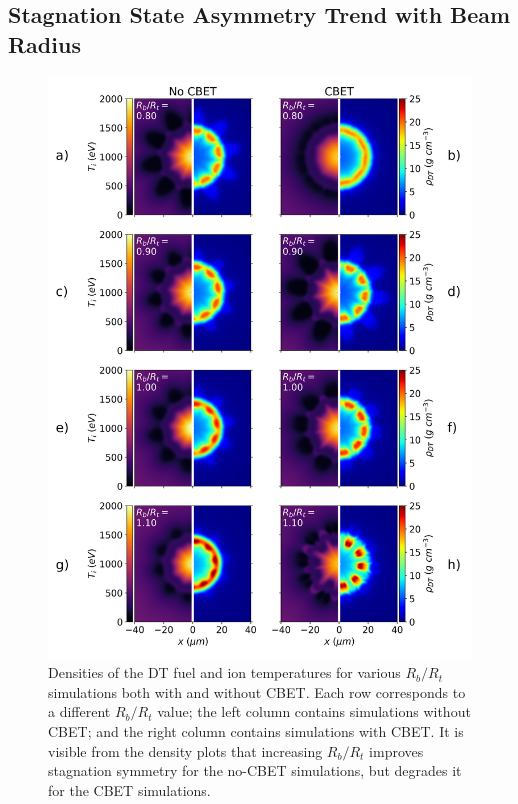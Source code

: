 \subsection{Stagnation State Asymmetry Trend with Beam Radius}%
\label{sec:Res1_stagnation_asymm_trend}

\begin{figure}[t!]
    \includegraphics[width=0.9\linewidth]{Results1/Images/Stagnation_plots.png}
    \centering
    \caption{Densities of the DT fuel and ion temperatures for various $R_b/R_t$ simulations both with and without \ac{CBET}.
    Each row corresponds to a different $R_b/R_t$ value; the left column contains simulations without \ac{CBET}; and the right column contains simulations with \ac{CBET}.
    It is visible from the density plots that increasing $R_b/R_t$ improves stagnation symmetry for the no-\ac{CBET} simulations, but degrades it for the \ac{CBET} simulations.}%
    \label{fig:Res1_stagnation_plots}
\end{figure}

